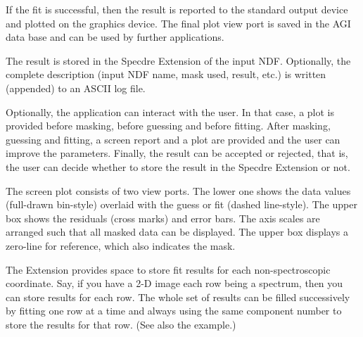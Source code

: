 {{      If the fit is successful, then the result is reported to
      the standard output device and plotted on the graphics device. The
      final plot view port is saved in the AGI data base and can be used
      by further applications.

      The result is stored in the Specdre Extension of the input NDF.
      Optionally, the complete description (input NDF name, mask used,
      result, etc.) is written (appended) to an ASCII log file.

      Optionally, the application can interact with the user. In that
      case, a plot is provided before masking, before guessing and
      before fitting. After masking, guessing and fitting, a screen
      report and a plot are provided and the user can improve the
      parameters. Finally, the result can be accepted or rejected, that
      is, the user can decide whether to store the result in the Specdre
      Extension or not.

      The screen plot consists of two view ports. The lower one shows the
      data values (full-drawn bin-style) overlaid with the guess or fit
      (dashed line-style). The upper box shows the residuals (cross
      marks) and error bars. The axis scales are arranged such that
      all masked data can be displayed. The upper box displays a
      zero-line for reference, which also indicates the mask.

      The Extension provides space to store fit results for each
      non-spectroscopic coordinate. Say, if you have a 2-D image each
      row being a spectrum, then you can store results for each row. The
      whole set of results can be filled successively by fitting one row
      at a time and always using the same component number to store the
      results for that row. (See also the example.)

}}
